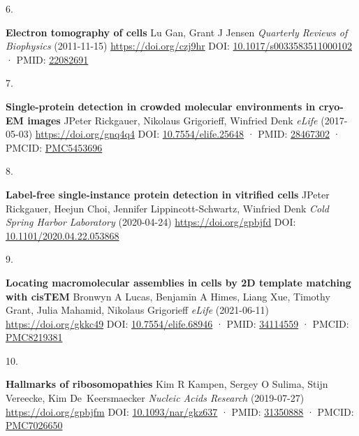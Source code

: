 \documentclass[
]{article}
\newlength{\cslhangindent}
\newlength{\csllabelwidth}
\newlength{\cslentryspacingunit} %
\newenvironment{CSLReferences}[2] %
 {%
  \setlength{\parindent}{0pt}
  \ifodd #1
  \let\oldpar\par
  \def\par{\hangindent=\cslhangindent\oldpar}
  \fi
  \setlength{\parskip}{#2\cslentryspacingunit}
 }%
 {}
\newcommand{\CSLBlock}[1]{#1\hfill\break}
\newcommand{\CSLLeftMargin}[1]{\parbox[t]{\csllabelwidth}{#1}}
\newcommand{\CSLRightInline}[1]{\parbox[t]{\linewidth - \csllabelwidth}{#1}\break}
\begin{document}
\begin{CSLReferences}{0}{0}
\leavevmode{}%
\CSLLeftMargin{6. }%
\CSLRightInline{\textbf{Electron tomography of cells}
\CSLBlock{Lu Gan, Grant J Jensen} \emph{Quarterly Reviews of Biophysics} (2011-11-15) \url{https://doi.org/czj9hr}
\CSLBlock{DOI: \href{https://doi.org/10.1017/s0033583511000102}{10.1017/s0033583511000102} · PMID: \href{https://www.ncbi.nlm.nih.gov/pubmed/22082691}{22082691}}}

\leavevmode{}%
\CSLLeftMargin{7. }%
\CSLRightInline{\textbf{Single-protein detection in crowded molecular environments in cryo-EM images}
\CSLBlock{JPeter Rickgauer, Nikolaus Grigorieff, Winfried Denk} \emph{eLife} (2017-05-03) \url{https://doi.org/gnq4q4}
\CSLBlock{DOI: \href{https://doi.org/10.7554/elife.25648}{10.7554/elife.25648} · PMID: \href{https://www.ncbi.nlm.nih.gov/pubmed/28467302}{28467302} · PMCID: \href{https://www.ncbi.nlm.nih.gov/pmc/articles/PMC5453696}{PMC5453696}}}

\leavevmode{}%
\CSLLeftMargin{8. }%
\CSLRightInline{\textbf{Label-free single-instance protein detection in vitrified cells}
\CSLBlock{JPeter Rickgauer, Heejun Choi, Jennifer Lippincott-Schwartz, Winfried Denk} \emph{Cold Spring Harbor Laboratory} (2020-04-24) \url{https://doi.org/gpbjfd}
\CSLBlock{DOI: \href{https://doi.org/10.1101/2020.04.22.053868}{10.1101/2020.04.22.053868}}}

\leavevmode{}%
\CSLLeftMargin{9. }%
\CSLRightInline{\textbf{Locating macromolecular assemblies in cells by 2D template matching with cisTEM}
\CSLBlock{Bronwyn A Lucas, Benjamin A Himes, Liang Xue, Timothy Grant, Julia Mahamid, Nikolaus Grigorieff} \emph{eLife} (2021-06-11) \url{https://doi.org/gkkc49}
\CSLBlock{DOI: \href{https://doi.org/10.7554/elife.68946}{10.7554/elife.68946} · PMID: \href{https://www.ncbi.nlm.nih.gov/pubmed/34114559}{34114559} · PMCID: \href{https://www.ncbi.nlm.nih.gov/pmc/articles/PMC8219381}{PMC8219381}}}

\leavevmode{}%
\CSLLeftMargin{10. }%
\CSLRightInline{\textbf{Hallmarks of ribosomopathies}
\CSLBlock{Kim R Kampen, Sergey O Sulima, Stijn Vereecke, Kim De~Keersmaecker} \emph{Nucleic Acids Research} (2019-07-27) \url{https://doi.org/gpbjfm}
\CSLBlock{DOI: \href{https://doi.org/10.1093/nar/gkz637}{10.1093/nar/gkz637} · PMID: \href{https://www.ncbi.nlm.nih.gov/pubmed/31350888}{31350888} · PMCID: \href{https://www.ncbi.nlm.nih.gov/pmc/articles/PMC7026650}{PMC7026650}}}


\end{CSLReferences}
\end{document}
